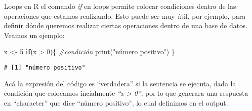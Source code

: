 \documentclass[
  8pt,
  ignorenonframetext,
]{beamer}
\newenvironment{Shaded}{\begin{snugshade}}{\end{snugshade}}
\newcommand{\CommentTok}[1]{\textcolor[rgb]{0.56,0.35,0.01}{\textit{#1}}}
\newcommand{\ControlFlowTok}[1]{\textcolor[rgb]{0.13,0.29,0.53}{\textbf{#1}}}
\newcommand{\DecValTok}[1]{\textcolor[rgb]{0.00,0.00,0.81}{#1}}
\newcommand{\FunctionTok}[1]{\textcolor[rgb]{0.00,0.00,0.00}{#1}}
\newcommand{\NormalTok}[1]{#1}
\newcommand{\OtherTok}[1]{\textcolor[rgb]{0.56,0.35,0.01}{#1}}
\newcommand{\SpecialCharTok}[1]{\textcolor[rgb]{0.00,0.00,0.00}{#1}}
\newcommand{\StringTok}[1]{\textcolor[rgb]{0.31,0.60,0.02}{#1}}
\begin{document}
\begin{frame}[fragile]{Loops en R}
\protect\hypertarget{loops-en-r-5}{}
el comando \emph{if} en loops permite colocar condiciones dentro de las
operaciones que estamos realizando. Esto puede ser muy útil, por
ejemplo, para definir dónde queremos realizar ciertas operaciones dentro
de una base de datos. Veamos un ejemplo:

\begin{Shaded}
\begin{Highlighting}[]
\NormalTok{x }\OtherTok{\textless{}{-}} \DecValTok{5}
\ControlFlowTok{if}\NormalTok{(x }\SpecialCharTok{\textgreater{}} \DecValTok{0}\NormalTok{)\{ }\CommentTok{\#condición}
\FunctionTok{print}\NormalTok{(}\StringTok{"número positivo"}\NormalTok{)}
\NormalTok{\}}
\end{Highlighting}
\end{Shaded}

\begin{verbatim}
# [1] "número positivo"
\end{verbatim}

Acá la expresión del código es ``verdadera'' si la sentencia se ejecuta,
dada la condición que colocamos incialmente \emph{``x \textgreater{}
0''}, por lo que generara una respuesta en ``character'' que dice
``número positivo'', lo cual definimos en el output.
\end{frame}
\end{document}
